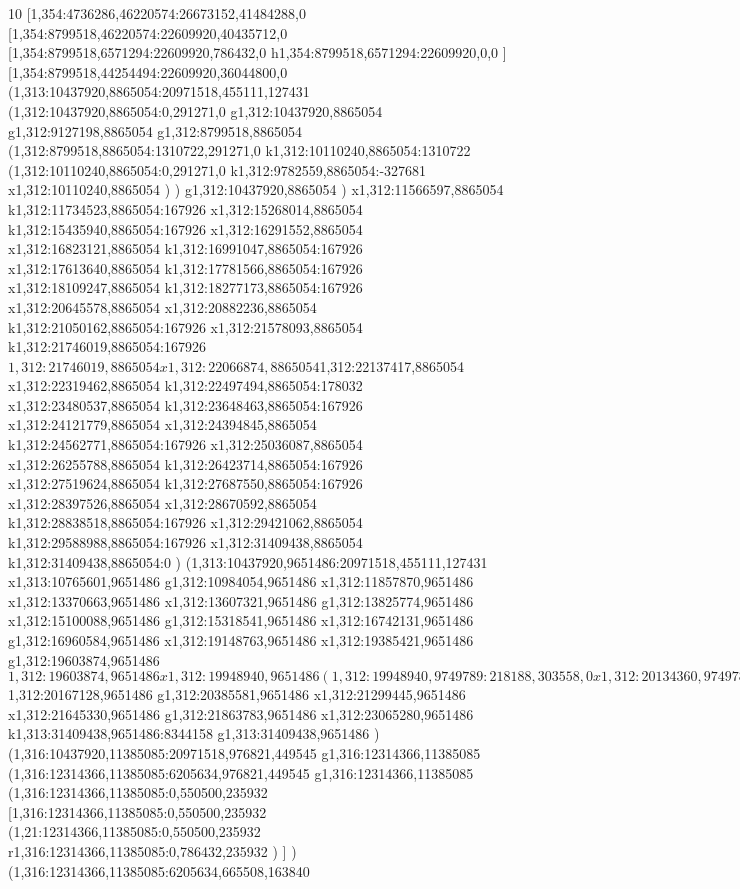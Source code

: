 {10
[1,354:4736286,46220574:26673152,41484288,0
[1,354:8799518,46220574:22609920,40435712,0
[1,354:8799518,6571294:22609920,786432,0
h1,354:8799518,6571294:22609920,0,0
]
[1,354:8799518,44254494:22609920,36044800,0
(1,313:10437920,8865054:20971518,455111,127431
(1,312:10437920,8865054:0,291271,0
g1,312:10437920,8865054
g1,312:9127198,8865054
g1,312:8799518,8865054
(1,312:8799518,8865054:1310722,291271,0
k1,312:10110240,8865054:1310722
(1,312:10110240,8865054:0,291271,0
k1,312:9782559,8865054:-327681
x1,312:10110240,8865054
)
)
g1,312:10437920,8865054
)
x1,312:11566597,8865054
k1,312:11734523,8865054:167926
x1,312:15268014,8865054
k1,312:15435940,8865054:167926
x1,312:16291552,8865054
x1,312:16823121,8865054
k1,312:16991047,8865054:167926
x1,312:17613640,8865054
k1,312:17781566,8865054:167926
x1,312:18109247,8865054
k1,312:18277173,8865054:167926
x1,312:20645578,8865054
x1,312:20882236,8865054
k1,312:21050162,8865054:167926
x1,312:21578093,8865054
k1,312:21746019,8865054:167926
$1,312:21746019,8865054
x1,312:22066874,8865054
$1,312:22137417,8865054
x1,312:22319462,8865054
k1,312:22497494,8865054:178032
x1,312:23480537,8865054
k1,312:23648463,8865054:167926
x1,312:24121779,8865054
x1,312:24394845,8865054
k1,312:24562771,8865054:167926
x1,312:25036087,8865054
x1,312:26255788,8865054
k1,312:26423714,8865054:167926
x1,312:27519624,8865054
k1,312:27687550,8865054:167926
x1,312:28397526,8865054
x1,312:28670592,8865054
k1,312:28838518,8865054:167926
x1,312:29421062,8865054
k1,312:29588988,8865054:167926
x1,312:31409438,8865054
k1,312:31409438,8865054:0
)
(1,313:10437920,9651486:20971518,455111,127431
x1,313:10765601,9651486
g1,312:10984054,9651486
x1,312:11857870,9651486
x1,312:13370663,9651486
x1,312:13607321,9651486
g1,312:13825774,9651486
x1,312:15100088,9651486
g1,312:15318541,9651486
x1,312:16742131,9651486
g1,312:16960584,9651486
x1,312:19148763,9651486
x1,312:19385421,9651486
g1,312:19603874,9651486
$1,312:19603874,9651486
x1,312:19948940,9651486
(1,312:19948940,9749789:218188,303558,0
x1,312:20134360,9749789
)
$1,312:20167128,9651486
g1,312:20385581,9651486
x1,312:21299445,9651486
x1,312:21645330,9651486
g1,312:21863783,9651486
x1,312:23065280,9651486
k1,313:31409438,9651486:8344158
g1,313:31409438,9651486
)
(1,316:10437920,11385085:20971518,976821,449545
g1,316:12314366,11385085
(1,316:12314366,11385085:6205634,976821,449545
g1,316:12314366,11385085
(1,316:12314366,11385085:0,550500,235932
[1,316:12314366,11385085:0,550500,235932
(1,21:12314366,11385085:0,550500,235932
r1,316:12314366,11385085:0,786432,235932
)
]
)
(1,316:12314366,11385085:6205634,665508,163840
}

